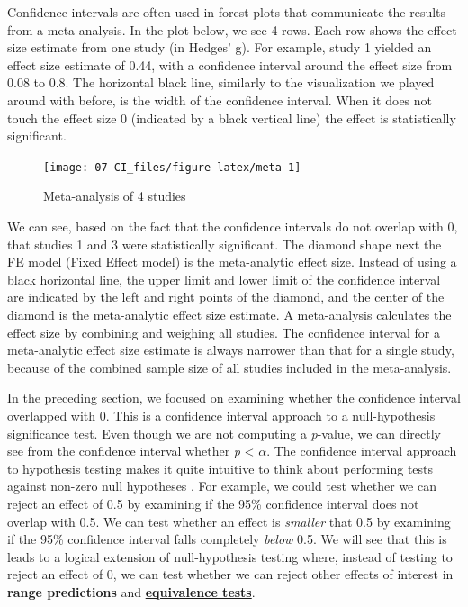 \documentclass[
  oneside]{book}
\begin{document}
Confidence intervals are often used in forest plots that communicate the results from a meta-analysis. In the plot below, we see 4 rows. Each row shows the effect size estimate from one study (in Hedges' g). For example, study 1 yielded an effect size estimate of 0.44, with a confidence interval around the effect size from 0.08 to 0.8. The horizontal black line, similarly to the visualization we played around with before, is the width of the confidence interval. When it does not touch the effect size 0 (indicated by a black vertical line) the effect is statistically significant.



\begin{figure}

{\centering \texttt{[image: 07-CI\_files/figure-latex/meta-1]} 

}

\caption{Meta-analysis of 4 studies}\label{fig:meta}
\end{figure}

We can see, based on the fact that the confidence intervals do not overlap with 0, that studies 1 and 3 were statistically significant. The diamond shape next the FE model (Fixed Effect model) is the meta-analytic effect size. Instead of using a black horizontal line, the upper limit and lower limit of the confidence interval are indicated by the left and right points of the diamond, and the center of the diamond is the meta-analytic effect size estimate. A meta-analysis calculates the effect size by combining and weighing all studies. The confidence interval for a meta-analytic effect size estimate is always narrower than that for a single study, because of the combined sample size of all studies included in the meta-analysis.

In the preceding section, we focused on examining whether the confidence interval overlapped with 0. This is a confidence interval approach to a null-hypothesis significance test. Even though we are not computing a \emph{p}-value, we can directly see from the confidence interval whether \emph{p} \textless{} \(\alpha\). The confidence interval approach to hypothesis testing makes it quite intuitive to think about performing tests against non-zero null hypotheses \citep{bauer_unifying_1996}. For example, we could test whether we can reject an effect of 0.5 by examining if the 95\% confidence interval does not overlap with 0.5. We can test whether an effect is \emph{smaller} that 0.5 by examining if the 95\% confidence interval falls completely \emph{below} 0.5. We will see that this is leads to a logical extension of null-hypothesis testing where, instead of testing to reject an effect of 0, we can test whether we can reject other effects of interest in \textbf{range predictions} and \protect\hyperlink{equivalencetest}{\textbf{equivalence tests}}.
\end{document}
